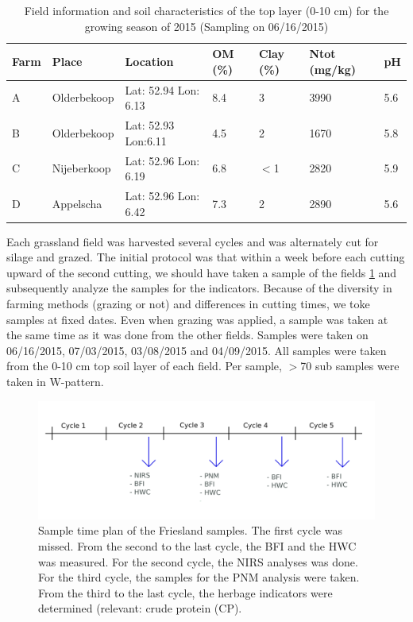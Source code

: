 \documentclass[10pt,twoside,dutch,english]{report}
\begin{document}
\begin{table}[ht] %
	\caption{Field information and soil characteristics of the top layer (0-10 cm) for the growing season of 2015 (Sampling on 06/16/2015) }
	\footnotesize 
	\renewcommand{\arraystretch}{1.2}
	
	
	\begin{tabu} to %
		\toprule	\rowfont{\bfseries}
		Farm & Place & Location & OM (\%) & Clay (\%) & Ntot (mg/kg) & pH \\  \midrule
		A & Olderbekoop & Lat: 52.94 Lon: 6.13 & 8.4 & 3 & 3990& 5.6 \\
		B & Olderbekoop& Lat: 52.93 Lon:6.11 & 4.5& 2& 1670& 5.8\\
		C & Nijeberkoop & Lat: 52.96 Lon: 6.19 & 6.8& $<$1& 2820& 5.9\\
		D & Appelscha & Lat: 52.96 Lon: 6.42 & 7.3& 2& 2890& 5.6\\		 \bottomrule
	\end{tabu}
		\label{tab:results_farms}
\end{table}

Each grassland field was harvested several cycles and was alternately cut for silage and grazed. The initial protocol was that within a week before each cutting upward of the second cutting, we should have taken a sample of the fields \ref{fig:mm_samples} and subsequently analyze the samples for the indicators. Because of the diversity in farming methods (grazing or not) and differences in cutting times, we toke samples at fixed dates.  Even when grazing was applied, a sample was taken at the same time as it was done from the other fields. Samples were taken on 06/16/2015, 07/03/2015, 03/08/2015 and 04/09/2015. All samples were taken from the 0-10 cm top soil layer of each field. Per sample, $>$70 sub samples were taken in W-pattern. 

\begin{figure}[h] %
	\includegraphics[width=1\linewidth]{mm_samples}
	\caption{Sample time plan of the Friesland samples. The first cycle was missed. From the second to the last cycle, the BFI and the HWC was measured. For the second cycle, the NIRS analyses was done. For the third cycle, the samples for the PNM analysis were taken. From the third to the last cycle, the herbage indicators were determined (relevant: crude protein (CP). }
	\label{fig:mm_samples}
\end{figure}
\end{document}
